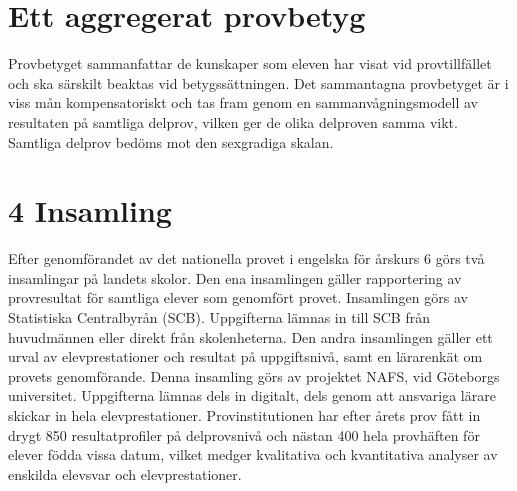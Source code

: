 \section*{Ett aggregerat provbetyg}
Provbetyget sammanfattar de kunskaper som eleven har visat vid provtillfället och ska särskilt beaktas vid betygssättningen. Det sammantagna provbetyget är i viss mån kompensatoriskt och tas fram genom en sammanvågningsmodell av resultaten på samtliga delprov, vilken ger de olika delproven samma vikt. Samtliga delprov bedöms mot den sexgradiga skalan.
\section*{4 Insamling}
Efter genomförandet av det nationella provet i engelska för årskurs 6 görs två insamlingar på landets skolor. Den ena insamlingen gäller rapportering av provresultat för samtliga elever som genomfört provet. Insamlingen görs av Statistiska Centralbyrån (SCB). Uppgifterna lämnas in till SCB från huvudmännen eller direkt från skolenheterna.
Den andra insamlingen gäller ett urval av elevprestationer och resultat på uppgiftsnivå, samt en lärarenkät om provets genomförande. Denna insamling görs av projektet NAFS, vid Göteborgs universitet. Uppgifterna lämnas dels in digitalt, dels genom att ansvariga lärare skickar in hela elevprestationer. Provinstitutionen har efter årets prov fått in drygt 850 resultatprofiler på delprovsnivå och nästan 400 hela provhäften för elever födda vissa datum, vilket medger kvalitativa och kvantitativa analyser av enskilda elevsvar och elevprestationer.
